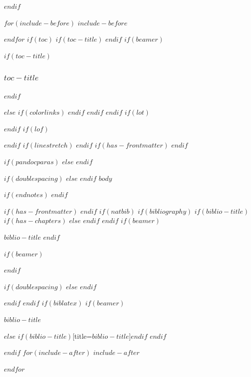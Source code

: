 \documentclass[
$if(fontsize)$
  $fontsize$,
$endif$
$if(lang)$
  $babel-lang$,
$endif$
$if(papersize)$
  $papersize$paper,
$endif$
$if(beamer)$
  ignorenonframetext,
$if(handout)$
  handout,
$endif$
$if(aspectratio)$
  aspectratio=$aspectratio$,
$endif$
$endif$
$for(classoption)$
  $classoption$$sep$,
$endfor$
]{$documentclass$}
\newif\ifbibliography
\begin{document}
$endif$ %

$for(include-before)$
$include-before$

$endfor$
$if(toc)$
$if(toc-title)$
\renewcommand*\contentsname{$toc-title$}
$endif$
$if(beamer)$
\begin{frame}[allowframebreaks]
$if(toc-title)$
  \frametitle{$toc-title$}
$endif$
  \tableofcontents[hideallsubsections]
\end{frame}
$else$
{
$if(colorlinks)$
\hypersetup{linkcolor=$if(toccolor)$$toccolor$$else$$endif$}
$endif$
\setcounter{tocdepth}{$toc-depth$}
\tableofcontents
}
$endif$
$endif$
$if(lot)$
\listoftables
$endif$
$if(lof)$
\listoffigures
$endif$
$if(linestretch)$
$endif$
$if(has-frontmatter)$
\mainmatter
$endif$

$if(pandocparas)$
$else$
\setlength{\parindent}{16pt}
\setlength{\parskip}{0pt}
$endif$

$if(doublespacing)$
\doublespacing
$else$
$endif$
$body$

$if(endnotes)$
\newpage
\theendnotes
$endif$

$if(has-frontmatter)$
\backmatter
$endif$
$if(natbib)$
$if(bibliography)$
$if(biblio-title)$
$if(has-chapters)$
\renewcommand\bibname{$biblio-title$}
$else$
\renewcommand\refname{$biblio-title$}
$endif$
$endif$
$if(beamer)$
\begin{frame}[allowframebreaks]{$biblio-title$}
  \bibliographytrue
$endif$
  
$if(beamer)$
\end{frame}
$endif$


$if(doublespacing)$
\singlespacing
$else$
$endif$

$endif$
$endif$
$if(biblatex)$
$if(beamer)$
\begin{frame}[allowframebreaks]{$biblio-title$}
  \bibliographytrue
  \printbibliography[heading=none]
\end{frame}
$else$
\printbibliography$if(biblio-title)$[title=$biblio-title$]$endif$
$endif$

$endif$
$for(include-after)$
$include-after$

$endfor$
\end{document}
